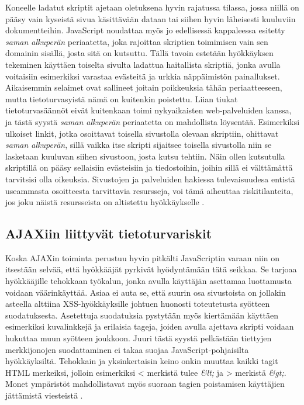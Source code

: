 Koneelle ladatut skriptit ajetaan oletuksena hyvin rajatussa tilassa, jossa niillä on pääsy vain kyseistä sivua käsittävään dataan tai siihen hyvin läheisesti kuuluviin dokumentteihin. 
JavaScript noudattaa myös jo edellisessä kappaleessa esitetty \emph{saman alkuperän} periaatetta, joka rajoittaa skriptien toimimisen vain sen domainin sisällä, josta sitä on kutsuttu.  
Tällä tavoin estetään hyökkäyksen tekeminen käyttäen toiselta sivulta ladattua haitallista skriptiä, jonka avulla voitaisiin esimerkiksi varastaa evästeitä ja urkkia näppäimistön painallukset.
Aikaisemmin selaimet ovat sallineet joitain poikkeuksia tähän periaatteeseen, mutta tietoturvasyistä nämä on kuitenkin poistettu. Liian tiukat tietoturvasäännöt eivät kuitenkaan toimi
nykyaikaisten web-palveluiden kanssa, ja tästä syystä \emph{saman alkuperän} periaatetta on mahdollista löysentää. Esimerkiksi ulkoiset linkit, jotka osoittavat toisella sivustolla olevaan
skriptiin, ohittavat \emph{saman alkuperän}, sillä vaikka itse skripti sijaitsee toisella sivustolla niin se lasketaan kuuluvan siihen sivustoon, josta kutsu tehtiin. Näin ollen 
kutsutulla skriptillä on pääsy sellaisiin evästeisiin ja tiedostoihin, joihin sillä ei välttämättä tarvitsisi olla oikeuksia. Sivustojen ja palveluiden hakiessa tulevaisuudesa
entistä useammasta osoitteesta tarvittavia resursseja, voi tämä aiheuttaa riskitilanteita, jos joku näistä resursseista on altistettu hyökkäykselle \cite{AJAX}.

\subsection{AJAXiin liittyvät tietoturvariskit}

Koska AJAXin toiminta perustuu hyvin pitkälti JavaScriptin varaan niin on itsestään selvää, että hyökkääjät pyrkivät hyödyntämään tätä seikkaa. Se tarjoaa hyökkääjille tehokkaan työkalun,
jonka avulla käyttäjän asettamaa luottamusta voidaan väärinkäyttää. Asiaa ei auta se, että suurin osa sivustoista on jollakin asteella alttiina XSS-hyökkäyksille \cite{WEB2c} johtuen huonosti
toteutetusta syötteen suodatuksesta. Asetettuja suodatuksia pystytään myös kiertämään käyttäen esimerkiksi kuvalinkkejä ja erilaisia tageja, joiden avulla ajettava skripti voidaan 
hukuttaa muun syötteen joukkoon. Juuri tästä syystä pelkästään tiettyjen merkkijonojen suodattaminen ei takaa suojaa JavaScript-pohjaisilta hyökkäyksiltä. Tehokkain ja yksinkertaisin keino
onkin muuttaa kaikki tagit HTML merkeiksi, jolloin esimerkiksi < merkistä tulee \emph{&lt;} ja > merkistä \emph{&gt;}. Monet ympäristöt mahdollistavat myös suoraan tagien poistamisen käyttäjien
jättämistä viesteistä \cite{AJAX}.

